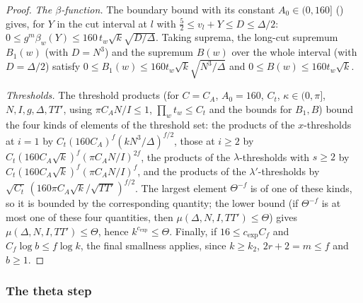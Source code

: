 \begin{proof}
\emph{The $\beta$-function.} The boundary bound  with its constant
$A_0\in(0,160]$ () gives, for $Y$ in the cut interval at $l$ with
$\frac52\le v_l+Y\le D\le\Delta/2$: $0\le g^m\beta_w(Y)\le160\,t_w\sqrt k\sqrt{D/\Delta}$. Taking suprema, the long-cut supremum
$B_1(w)$ (with $D=N^3$) and the supremum $B(w)$ over the whole interval (with $D=\Delta/2$) satisfy $0\le B_1(w)\le160t_w\sqrt
k\sqrt{N^3/\Delta}$ and $0\le B(w)\le160t_w\sqrt k$.

\emph{Thresholds.} The threshold products  (for $C=C_A$, $A_0=160$,
$C_t$, $\kappa\in(0,\pi]$, $N,I,g,\Delta,TT'$, using $\pi C_AN/I\le1$, $\prod_wt_w\le C_t$ and the bounds for $B_1,B$) bound the
four kinds of elements of the threshold set: the products of the $x$-thresholds at $i=1$ by
$C_t(160C_A)^f(kN^3/\Delta)^{f/2}$, those at $i\ge2$ by $C_t(160C_A\sqrt k)^f(\pi C_AN/I)^{2f}$, the products of the
$\lambda$-thresholds with $s\ge2$ by $C_t(160C_A\sqrt k)^f(\pi C_AN/I)^f$, and the products of the $\lambda'$-thresholds by
$\sqrt{C_t}\,(160\pi C_A\sqrt k/\sqrt{TT'})^{f/2}$. The largest element $\Theta^{-f}$ is of one of these kinds, so it is bounded
by the corresponding quantity; the lower bound  (if $\Theta^{-f}$ is
at most one of these four quantities, then $\mu(\Delta,N,I,TT')\le\Theta$) gives $\mu(\Delta,N,I,TT')\le\Theta$, hence
$k^{c_{\exp}}\le\Theta$. Finally, if $16\le c_{\exp}C_f$ and $C_f\log b\le f\log k$, the final smallness applies, since
$k\ge k_2$, $2r+2=m\le f$ and $b\ge1$.
\end{proof}

\subsubsection{The theta step}\label{sec:pf:thmS:theta}

